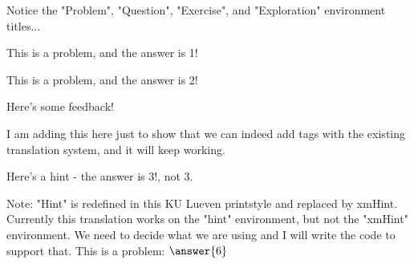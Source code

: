 \documentclass{ximera}
\begin{document}
        Notice the "Problem", "Question", "Exercise", and "Exploration" environment titles... 
        \begin{problem}%
            This is a problem, and the answer is 1! %
            \begin{multipleChoice}
            \end{multipleChoice}%
        \end{problem}
            
        \begin{question}
            This is a problem, and the answer is 2! %
            \begin{selectAll}
            \end{selectAll}%
            \begin{feedback}
                Here's some feedback!
            \end{feedback}
            \begin{feedback}[correct]
                I am adding this here just to show that we can indeed add tags with the existing translation system, and it will keep working.%
            \end{feedback}
        \end{question}
            
        \begin{exercise}
            \begin{hint}
                Here's a hint - the answer is 3!, not 3.
            \end{hint}
            Note: "Hint" is redefined in this KU Lueven printstyle and replaced by xmHint. Currently this translation works on the "hint" environment, but not the "xmHint" environment. We need to decide what we are using and I will write the code to support that.
            This is a problem: $\answer{6}$
        \end{exercise}
            
\end{document}
